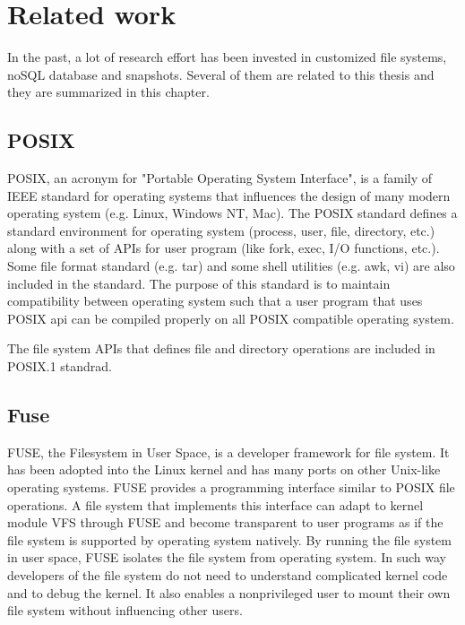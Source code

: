 \chapter{Related work}
\label{chap:related_work}

    In the past, a lot of research effort has been invested in customized file systems, noSQL database and snapshots. Several of them are related to this thesis and they are summarized in this chapter.

\section{POSIX}

    POSIX, an acronym for "Portable Operating System Interface", is a family of IEEE standard for operating systems that influences the design of many modern operating system (e.g. Linux, Windows NT, Mac). The POSIX standard defines a standard environment for operating system (process, user, file, directory, etc.) along with a set of APIs for user program (like fork, exec, I/O functions, etc.). Some file format standard (e.g. tar) and some shell utilities (e.g. awk, vi) are also included in the standard. The purpose of this standard is to maintain compatibility between operating system such that a user program that uses POSIX api can be compiled properly on all POSIX compatible operating system.

    The file system APIs that defines file and directory operations are included in POSIX.1 standrad.

\section{Fuse}

	FUSE, the Filesystem in User Space, is a developer framework for file system.  It has been adopted into the Linux kernel and has many ports on other Unix-like operating systems. FUSE provides a programming interface similar to POSIX file operations. A file system that implements this interface can adapt to kernel module VFS through FUSE and become transparent to user programs as if the file system is supported by operating system natively. By running the file system in user space, FUSE isolates the file system from operating system. In such way developers of the file system do not need to understand complicated kernel code and to debug the kernel. It also enables a nonprivileged user to mount their own file system without influencing other users.

